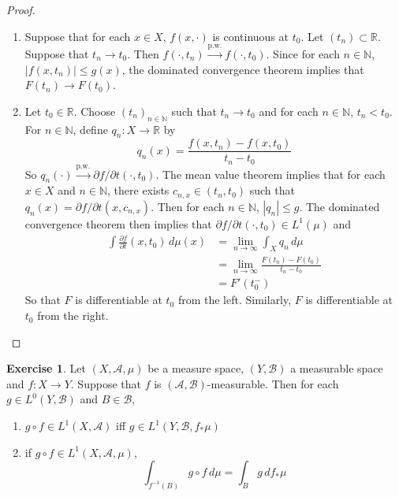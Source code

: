 \documentclass{book}
\theoremstyle{definition}
\newtheorem{ex}[definition]{Exercise}
\newcommand{\N}{\mathbb{N}}
\newcommand{\R}{\mathbb{R}}
\newcommand{\MA}{\mathcal{A}}
\newcommand{\MB}{\mathcal{B}}
\DeclareMathOperator*{\0}{\mbf{0}}
\DeclareMathOperator*{\1}{\mbf{1}}
\newcommand{\p}{\partial}
\newcommand{\limn}{\lim \limits_{n \rightarrow \infty}}
\newcommand{\convt}[1]{\xrightarrow{\text{#1}}}
\newcommand{\dmu}{\, d \mu}
\begin{document}
	\begin{proof}\
	\begin{enumerate}
	\item Suppose that for each $x \in X$, $f(x, \cdot)$ is continuous at $t_0$. Let $(t_n) \subset \R$. Suppose that $t_n \rightarrow t_0$. Then $f(\cdot , t_n) \convt{p.w.} f(\cdot, t_0)$. Since for each $n \in \N$, $|f(x,t_n)| \leq g(x)$, the dominated convergence theorem implies that $F(t_n) \rightarrow F(t_0)$.
	\item Let $t_0 \in \R$. Choose $(t_n)_{n \in \N}$ such that $ t_n \rightarrow t_0$ and for each $n \in \N$, $t_n < t_0$. For $n \in \N$, define $q_n:X \rightarrow \R$ by $$q_n(x) = \frac{f(x,t_n) - f(x, t_0)}{t_n - t_0}$$ So $q_n(\cdot) \convt{p.w.} \p f / \p t (\cdot, t_0)$. The mean value theorem implies that for each $x \in X$ and $n \in \N$, there exists $c_{n,x} \in (t_n,t_0)$ such that $q_n(x) = \p f / \p t (x, c_{n,x})$. Then for each $n \in \N$, $|q_n| \leq g$. The dominated convergence theorem then implies that $\p f / \p t (\cdot, t_0) \in L^1(\mu)$ and 
	\begin{align*}
	\int \frac{\p f }{\p t} (x, t_0) \dmu(x) 
	&=  \limn \int_X q_n \dmu  \\
	&= \limn \frac{F(t_n) - F(t_0)}{t_n - t_0} \\
	&= F'(t_0^-) 	
	\end{align*}
	So that $F$ is differentiable at $t_0$ from the left. Similarly, $F$ is differentiable at $t_0$ from the right. 
	\end{enumerate}
	\end{proof}

	\begin{ex}
		Let $(X, \MA, \mu)$ be a measure space, $(Y, \MB)$ a measurable space and $f: X \rightarrow Y$. Suppose that $f$ is $(\MA, \MB)$-measurable. Then for each $g \in L^0(Y, \MB)$ and $B \in \MB$, 
		\begin{enumerate}
			\item $g \circ f \in L^1(X, \MA)$ iff $g \in L^1(Y, \MB, f_* \mu)$
			\item if $g \circ f \in L^1(X, \MA, \mu)$, 
			$$\int_{f^{-1}(B)} g \circ f \dmu = \int_B g \, d f_*\mu$$
		\end{enumerate}
	\end{ex}
\end{document}
